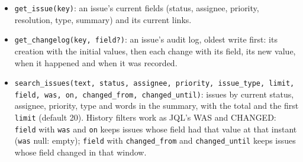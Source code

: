 \documentclass{article}
\newcommand{\code}[1]{\texttt{#1}}
\begin{document}
\begin{itemize}[leftmargin=*]
\item \code{get\_issue(key)}: an issue's current fields (status, assignee, priority, resolution, type, summary) and its current links.
\item \code{get\_changelog(key, field?)}: an issue's audit log, oldest write first: its creation with the initial values, then each change with its field, its new value, when it happened and when it was recorded.
\item \code{search\_issues(text, status, assignee, priority, issue\_type, limit, field, was, on, changed\_from, changed\_until)}: issues by current status, assignee, priority, type and words in the summary, with the total and the first \code{limit} (default 20). History filters work as JQL's WAS and CHANGED: \code{field} with \code{was} and \code{on} keeps issues whose field had that value at that instant (\code{was} null: empty); \code{field} with \code{changed\_from} and \code{changed\_until} keeps issues whose field changed in that window.
\end{itemize}
\end{document}
